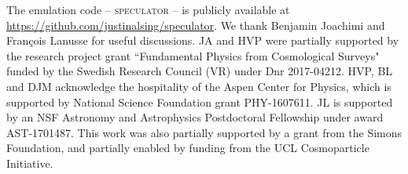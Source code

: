 \documentclass[twocolumn]{aastex62}
\begin{document}
The emulation code -- \textsc{speculator} -- is publicly available at \url{https://github.com/justinalsing/speculator}.
%
%
%
\acknowledgments
We thank Benjamin Joachimi and Fran\c{c}ois Lanusse for useful discussions. JA and HVP were partially supported by the research project grant ``Fundamental Physics from Cosmological Surveys" funded by the Swedish Research Council (VR) under Dnr 2017-04212. HVP, BL and DJM acknowledge the hospitality of the Aspen Center for Physics, which is supported by National Science Foundation grant PHY-1607611. JL is supported by an NSF Astronomy and Astrophysics Postdoctoral Fellowship under award AST-1701487. This work was also partially supported by a grant from the Simons Foundation, and partially enabled by funding from the UCL Cosmoparticle Initiative.


\end{document}
